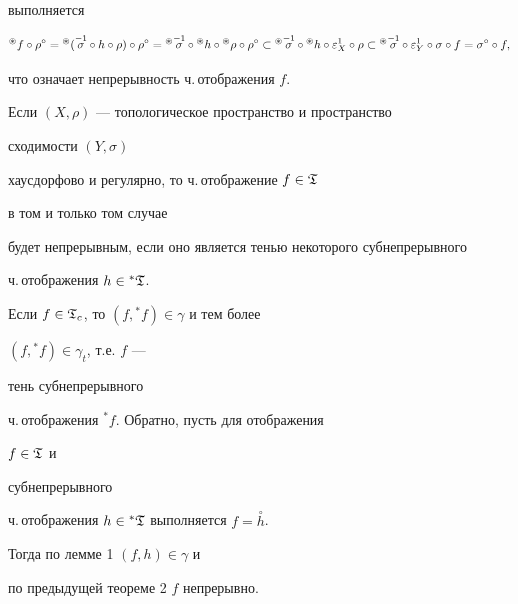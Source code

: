 \begin{pf}
выполняется


$$


{}^\circledast f\circ \rho^\circ ={}^\circledast


(\mis \circ h\circ \rho)\circ \rho^\circ =


{}^\circledast \mis \circ {}^\circledast h\circ


{}^\circledast\rho\circ \rho^\circ \subset


{}^\circledast\mis \circ {}^\circledast h\circ


\varepsilon^1_X\circ \rho\subset {}^\circledast \mis


\circ \varepsilon^1_Y\circ \sigma\circ f=


\sigma^\circ \circ f,


$$


что означает непрерывность ч.\,отображения $f$.


\end{pf}





\begin{cor}


Если $(X,\rho)$ --- топологическое пространство и пространство


сходимости $(Y,\sigma)$


хаусдорфово и регулярно, то ч.\,отображение $f\in\frak T$


в том и только том случае


будет непрерывным, если оно является тенью некоторого субнепрерывного


ч.\,отображения $h\in{}^*\frak T$.


\end{cor}





\begin{pf}


Если $f\in\frak T_c$, то $(f,{}^* f)\in\gamma$ и тем более


$(f,{}^* f)\in\gamma_t$, т.е. $f$ ---


тень субнепрерывного


ч.\,отображения ${}^* f$. Обратно, пусть для отображения


$f\in\frak T$ и


субнепрерывного


ч.\,отображения $h\in{}^*\frak T$ выполняется $f=\overset{\circ}{h}$.


Тогда по лемме 1\; $(f,h)\in\gamma$ и


по предыдущей теореме 2\; $f$ непрерывно.


\end{pf}





